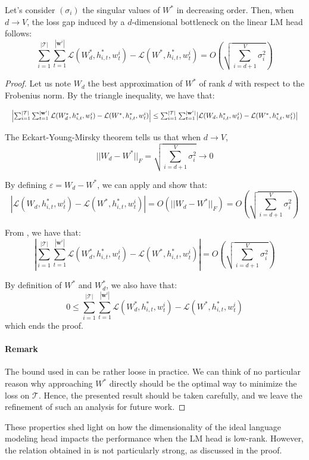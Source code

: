 \begin{theorem}
\label{main_thm}
Let's consider $(\sigma_i)$ the singular values of $W^*$ in decreasing order. Then, when $d \rightarrow V$, the loss gap induced by a $d$-dimensional bottleneck on the linear LM head follows:
$$
\sum_{i=1}^{|\mathcal{T}|} \sum_{t=1}^{|\mathbf{w}^i|} \mathcal{L}(W_d^*, h^*_{i,t}, w^i_t) - \mathcal{L}(W^*, h^*_{i,t}, w^i_t) = O\left(\sqrt{\sum_{i=d+1}^{V}\sigma_i^2}\right)$$
\end{theorem}
\begin{proof}
     Let us note $W_d$ the best approximation of $W^*$ of rank $d$ with respect to the Frobenius norm. By the triangle inequality, we have that:

\begin{equation}
\label{eq:approx}
\resizebox{\columnwidth}{!}{$\left|\sum_{i=1}^{|\mathcal{T}|} \sum_{t=1}^{|\mathbf{w}^i|} \mathcal{L}(W_d^*, h^*_{i,t}, w^i_t) - \mathcal{L}(W^*, h^*_{i,t}, w^i_t)\right| \leq \sum_{i=1}^{|\mathcal{T}|} \sum_{t=1}^{|\mathbf{w}^i|} \left|\mathcal{L}(W_d, h^*_{i,t}, w^i_t) - \mathcal{L}(W^*, h^*_{i,t}, w^i_t)\right|$}
\end{equation}



The Eckart-Young-Mirsky theorem tells us that when $d \rightarrow V$, 
$$||W_d - W^*||_F = \sqrt{\sum_{i=d+1}^{V} \sigma_i^2} \rightarrow 0$$

By defining $\varepsilon = W_d - W^*$, we can apply  and show that:
$$
\left|\mathcal{L}(W_d, h^*_{i,t}, w^i_t) - \mathcal{L}(W^*, h^*_{i,t}, w^i_t)\right| = O(||W_d - W^*||_F) = O\left(\sqrt{\sum_{i=d+1}^{V} \sigma_i^2}\right)
$$

From , we have that:
$$
\left|\sum_{i=1}^{|\mathcal{T}|} \sum_{t=1}^{|\mathbf{w}^i|} \mathcal{L}(W_d^*, h^*_{i,t}, w^i_t) - \mathcal{L}(W^*, h^*_{i,t}, w^i_t)\right| = O\left(\sqrt{\sum_{i=d+1}^{V} \sigma_i^2}\right)
$$

By definition of $W^*$ and $W_d^*$, we also have that:
$$
0 \leq \sum_{i=1}^{|\mathcal{T}|} \sum_{t=1}^{|\mathbf{w}^i|} \mathcal{L}(W_d^*, h^*_{i,t}, w^i_t) - \mathcal{L}(W^*, h^*_{i,t}, w^i_t)
$$
which ends the proof.

\paragraph{Remark} The bound used in  can be rather loose in practice. We can think of no particular reason why approaching $W^*$ directly should be the optimal way to minimize the loss on $\mathcal{T}$. Hence, the presented result should be taken carefully, and we leave the refinement of such an analysis for future work.

\end{proof}
These properties shed light on how the dimensionality of the ideal language modeling head impacts the performance when the LM head is low-rank. However, the relation obtained in  is not particularly strong, as discussed in the proof.

